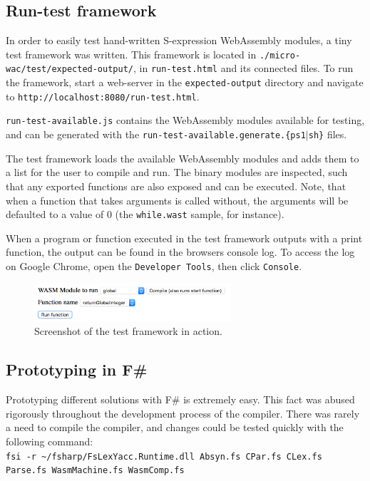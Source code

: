 \documentclass[a4paper]{article}
\begin{document}
\subsection{Run-test framework}
\label{sec:peripherals:run-test-framework}
In order to easily test hand-written S-expression WebAssembly modules, a tiny test framework was written. This framework is located in \texttt{./micro-wac/test/expected-output/}, in \texttt{run-test.html} and its connected files. To run the framework, start a web-server in the \texttt{expected-output} directory and navigate to \texttt{http://localhost:8080/run-test.html}.

\texttt{run-test-available.js} contains the WebAssembly modules available for testing, and can be generated with the \texttt{run-test-available.generate.\{ps1$|$sh\}} files.

The test framework loads the available WebAssembly modules and adds them to a list for the user to compile and run. The binary modules are inspected, such that any exported functions are also exposed and can be executed. Note, that when a function that takes arguments is called without, the arguments will be defaulted to a value of 0 (the \texttt{while.wast} sample, for instance).

When a program or function executed in the test framework outputs with a print function, the output can be found in the browsers console log. To access the log on Google Chrome, open the \texttt{Developer Tools}, then click \texttt{Console}.

\begin{figure}[H]
	\includegraphics[width=0.65\textwidth]{WasmTestFrameworkScreenshot}
	\centering
	\caption{Screenshot of the test framework in action.}
\end{figure}

\subsection{Prototyping in F\#}
\label{sec:peripherals:prototyping}
Prototyping different solutions with F\# is extremely easy. This fact was abused rigorously throughout the development process of the compiler. There was rarely a need to compile the compiler, and changes could be tested quickly with the following command:\\
\texttt{fsi -r \textasciitilde/fsharp/FsLexYacc.Runtime.dll Absyn.fs CPar.fs CLex.fs Parse.fs WasmMachine.fs WasmComp.fs}
\end{document}

